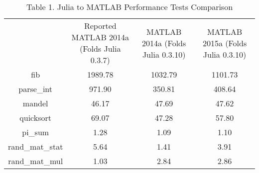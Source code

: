 \begin{table} 
    \begin{tabular}{ c c c c }
         & Reported MATLAB 2014a (Folds Julia 0.3.7) & MATLAB 2014a (Folds Julia 0.3.10) & MATLAB 2015a (Folds Julia 0.3.10) \\ 
        fib & 1989.78 & 1032.79 & 1101.73 \\ 
        parse\_int & 971.90 & 350.81 & 408.64 \\ 
        mandel & 46.17 & 47.69 & 47.62 \\ 
        quicksort & 69.07 & 47.28 & 57.80 \\ 
        pi\_sum & 1.28 & 1.09 & 1.10 \\ 
        rand\_mat\_stat & 5.64 & 1.41 & 3.91 \\ 
        rand\_mat\_mul & 1.03 & 2.84 & 2.86 \\ 
    \end{tabular} 
    \caption{Table 1. Julia to MATLAB Performance Tests Comparison} 
\end{table}

  
  
  
  
  
  
  
  
  
  
  
  
  
  
  
  
  
  